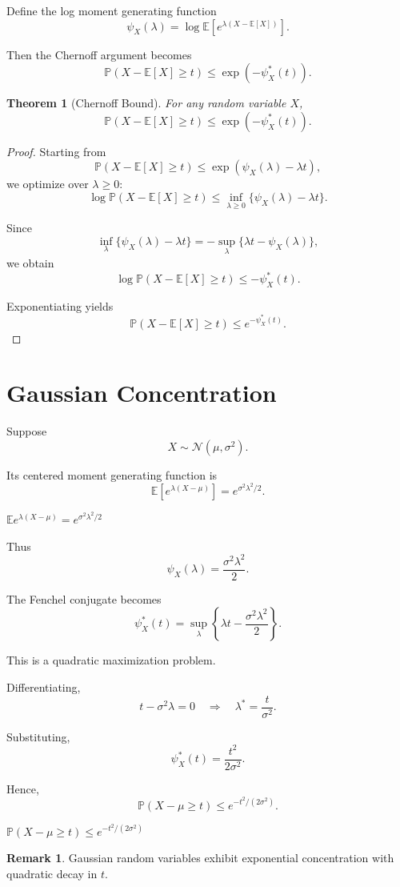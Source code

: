 \documentclass[12pt,oneside]{book}
\numberwithin{equation}{section}
\theoremstyle{definition}
\newtheorem{remark}{Remark}[section]
\theoremstyle{plain}
\newtheorem{theorem}{Theorem}[section]
\theoremstyle{remark}
\newcommand{\E}{\mathbb{E}}
\newcommand{\Prob}{\mathbb{P}}
\newcommand{\Normal}{\mathcal{N}}
\begin{document}
Define the log moment generating function
\[
\psi_X(\lambda)
=
\log\E[e^{\lambda(X-\E[X])}].
\]

Then the Chernoff argument becomes
\[
\Prob(X-\E[X]\geq t)
\leq
\exp(-\psi_X^*(t)).
\]

\begin{theorem}[Chernoff Bound]
For any random variable $X$,
\[
\Prob(X-\E[X]\geq t)
\leq
\exp(-\psi_X^*(t)).
\]
\end{theorem}

\begin{proof}
Starting from
\[
\Prob(X-\E[X]\geq t)
\leq
\exp(
\psi_X(\lambda)-\lambda t
),
\]
we optimize over $\lambda\geq0$:
\[
\log\Prob(X-\E[X]\geq t)
\leq
\inf_{\lambda\geq0}
\{
\psi_X(\lambda)-\lambda t
\}.
\]

Since
\[
\inf_{\lambda}
\{
\psi_X(\lambda)-\lambda t
\}
=
-
\sup_{\lambda}
\{
\lambda t-\psi_X(\lambda)
\},
\]
we obtain
\[
\log\Prob(X-\E[X]\geq t)
\leq
-\psi_X^*(t).
\]

Exponentiating yields
\[
\Prob(X-\E[X]\geq t)
\leq
e^{-\psi_X^*(t)}.
\]
\end{proof}

\section{Gaussian Concentration}

Suppose
\[
X\sim \Normal(\mu,\sigma^2).
\]

Its centered moment generating function is
\[
\E[e^{\lambda(X-\mu)}]
=
e^{\sigma^2\lambda^2/2}.
\]

$\mathbb{E}e^{\lambda(X-\mu)}=e^{\sigma^2\lambda^2/2}$

Thus
\[
\psi_X(\lambda)
=
\frac{\sigma^2\lambda^2}{2}.
\]

The Fenchel conjugate becomes
\[
\psi_X^*(t)
=
\sup_{\lambda}
\left\{
\lambda t-\frac{\sigma^2\lambda^2}{2}
\right\}.
\]

This is a quadratic maximization problem.

Differentiating,
\[
t-\sigma^2\lambda=0
\quad\Rightarrow\quad
\lambda^*=\frac{t}{\sigma^2}.
\]

Substituting,
\[
\psi_X^*(t)
=
\frac{t^2}{2\sigma^2}.
\]

Hence,
\[
\Prob(X-\mu\geq t)
\leq
e^{-t^2/(2\sigma^2)}.
\]

$\mathbb{P}(X-\mu\ge t)\le e^{-t^2/(2\sigma^2)}$

\begin{remark}
Gaussian random variables exhibit exponential concentration with quadratic decay in $t$.
\end{remark}
\end{document}
